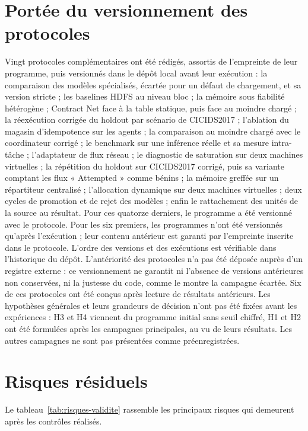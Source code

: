 \section{Portée du versionnement des protocoles}
\label{sec:preenregistrement}

Vingt protocoles complémentaires ont été rédigés, assortis de l'empreinte de leur programme,
puis versionnés dans le dépôt local avant leur exécution : la comparaison des modèles
spécialisés, écartée pour un défaut de chargement, et sa version stricte ; les baselines HDFS
au niveau bloc ; la mémoire sous fiabilité hétérogène ; Contract Net face à la table
statique, puis face au moindre chargé ; la réexécution corrigée du holdout par
scénario de CICIDS2017 ; l'ablation du magasin d'idempotence sur les agents ; la
comparaison au moindre chargé avec le coordinateur corrigé ; le benchmark sur une
inférence réelle et sa mesure intra-tâche ; l'adaptateur de flux réseau ; le diagnostic de
saturation sur deux machines virtuelles ; la répétition du holdout sur CICIDS2017
corrigé, puis sa variante comptant les flux « Attempted » comme bénins ; la mémoire
greffée sur un répartiteur centralisé ; l'allocation dynamique sur deux machines virtuelles ; deux cycles de promotion et de rejet des modèles ; enfin le rattachement des unités de la source au résultat. Pour ces quatorze derniers, le programme a été versionné avec le protocole. Pour les six
premiers, les programmes n'ont été versionnés qu'après l'exécution ; leur contenu antérieur
est garanti par l'empreinte inscrite dans le protocole. L'ordre des versions et des
exécutions est vérifiable dans l'historique du dépôt. L'antériorité des protocoles n'a pas
été déposée auprès d'un registre externe : ce versionnement ne garantit ni l'absence de
versions antérieures non conservées, ni la justesse du code, comme le montre la campagne
écartée. Six de ces protocoles ont été conçus après lecture de résultats antérieurs. Les
hypothèses générales et leurs grandeurs de décision n'ont pas été fixées avant les
expériences : H3 et H4 viennent du programme initial sans seuil chiffré, H1 et H2 ont été
formulées après les campagnes principales, au vu de leurs résultats. Les autres campagnes
ne sont pas présentées comme préenregistrées.

\section{Risques résiduels}

Le tableau~\ref{tab:risques-validite} rassemble les principaux risques qui demeurent après
les contrôles réalisés.

